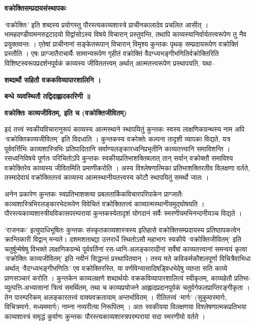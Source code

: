 \documentclass[10pt, a5paper, twoside]{article}
\newcommand{\customparagraph}[1]{
    \noindent \textbf{#1} \par
    \penalty 10000 %
    \vspace{0.1cm plus 0.05cm minus 0.02cm}
    \penalty 10000 %
}
\begin{document}
\customparagraph{\textbf{वक्रोक्तिसम्प्रदायसंस्थापकः}}

‘वक्रोक्तिः’ इति शब्दस्य प्रयोगस्तु पौरस्त्यकाव्यशास्त्रे प्राचीनकालादेव प्रचलित आसीत् । भामहदण्डीवामनरुद्रटादयो विद्वांसोऽस्य विषये विचारान् प्रस्तुवन्ति, तथापि काव्यस्यानिर्वार्यतत्त्वरूपेण तु नैव प्रयुक्तवन्तः । एतेषां प्राचीनानां सङ्केतरूपान् विचारान् विमृश्य कुन्तकः पृथक् सम्प्रदायरूपेण वक्रोक्तिं प्रस्तौति । एषः प्राग्जातैराचार्यैः सामान्यरूपेण गृहीतं वक्रोक्तिं वैदग्ध्यभङ्गीभणितिर्वक्रोक्तिरिति विशिष्टस्वरूपप्रदर्शनपूर्वकं काव्यस्य जीविततत्त्वम् अर्थात् आत्मतत्त्वरूपेण प्रस्थापयति, यथा–

\textbf{शब्दार्थौ सहितौ वक्रकविव्यापारशालिनि ।}

\textbf{बन्धे व्यवस्थितौ तद्विदाह्लादकारिणी ॥}

\textbf{वक्रोक्तिः काव्यजीवितम्, इति च  (वक्रोक्तिजीवितम्)}

इदं तत्त्वं स्वकीयविचारानुरूपं काव्यस्य आत्मस्थाने स्थापयितुं कुन्तकः स्वस्य लाक्षणिकग्रन्थस्य नाम अपि ‘वक्रोक्तिकाव्यजीवितम्’ इति विदधाति । कुन्तकस्य वक्रोक्तेः कल्पना तादृशी व्यापका विद्यते, यत्र पूर्ववर्त्तिभिः काव्यशास्त्रिभिः प्रतिपादितानि सर्वाण्यलङ्कारध्वनिप्रभृतीनि काव्यतत्त्वानि समाविशन्ति । रसध्वनिविषये पूर्णतः परिचितोऽपि कुन्तकः स्वकीयप्रतिभाशक्तिबलात् तान् सर्वान् वक्रोक्तौ समाविश्य वक्रोक्तिरेव काव्यस्य जीवितमिति प्रमाणीकरोति । अस्य विश्लेषणात्मिका प्रतिभाशक्तिरतीव विलक्षणा वर्तते, तस्मादेवायं वक्रोक्तितत्त्वं काव्यस्य आत्मस्थानीयतत्त्वस्य कोटौ स्थापयितुं समर्थो जातः ।

अनेन प्रकारेण कुन्तकः स्वप्रतिभाशक्त्या प्रबलतार्किकविचारपरिपाकेन प्राग्जातैः काव्यशास्त्रिभिरलङ्कारभेदरूपेण विवेचितं वक्रोक्तितत्त्वं काव्यात्मस्थानीयमुद्घोषयति । पौरस्त्यकाव्यशास्त्रीयविकासपरम्परायां कुन्तकस्येतादृशं योगदानं सर्वैः स्मरणीयमभिनन्दनीयञ्च विद्यते ।

‘राजनकः’  इत्युपाधिभूषितः कुन्तकः संस्कृतकाव्यशास्त्रस्य इतिहासे वक्रोक्तिसम्प्रदायस्य प्रतिष्ठापकत्वेन क्रान्तिकारी विद्वान् मन्यते। दशमशताब्द्या उत्तरार्धे स्थितोऽसौ महाभागः स्वकीये ‘वक्रोक्तिजीवितम्’ इति चतुर्षून्मेषेषु विभक्ते लाक्षणिकग्रन्थे पूर्ववर्तिनां रस-ध्वनि-अलङ्कारादीनां सर्वेषां काव्यतत्त्वानां समन्वयं कृत्वा ‘वक्रोक्तिः काव्यजीवितम्’ इति नवीनं सिद्धान्तं प्रस्थापितवान् । तस्य मते कविकर्मकौशलपूर्णा विचित्रैवाभिधा अर्थात् ‘वैदग्ध्यभङ्गीभणितिः’ एव वक्रोक्तिरस्ति, या वर्णविन्यासादिषड्विधभेदेषु व्याप्ता सति काव्ये प्राणसञ्चारं करोति । कुन्तकेन काव्यलक्षणे शब्दार्थयोः वक्रकविव्यापारशालित्वं स्वीकृतम्, काव्यहेतौ प्रतिभा-व्युत्पत्ति-अभ्यासानां त्रित्वं समर्थितम्, तथा च काव्यप्रयोजने आह्लादप्रदानपूर्वकं चतुर्वर्गफलप्राप्तिरङ्गीकृता । तेन पारम्परिकम् अलङ्कारतत्त्वं वाक्यवक्रतायाम् अन्तर्भावितम् । रीतितत्त्वं ‘मार्गः’ (सुकुमारमार्गः, विचित्रमार्गः, मध्यममार्गः) नाम्ना नव्यरीत्या निरूपितम् । अतः स्वकीयया विलक्षणया विश्लेषणात्मकप्रतिभया काव्यशास्त्रं समृद्धं कुर्वाणः कुन्तकः पौरस्त्यकाव्यशास्त्रपरम्परायां सदा स्मरणीयो वर्तते ।
\end{document}
